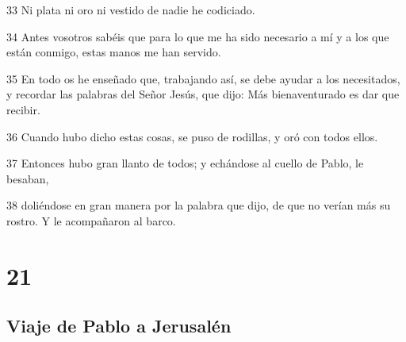 \par 33 Ni plata ni oro ni vestido de nadie he codiciado.
\par 34 Antes vosotros sabéis que para lo que me ha sido necesario a mí y a los que están conmigo, estas manos me han servido.
\par 35 En todo os he enseñado que, trabajando así, se debe ayudar a los necesitados, y recordar las palabras del Señor Jesús, que dijo: Más bienaventurado es dar que recibir.
\par 36 Cuando hubo dicho estas cosas, se puso de rodillas, y oró con todos ellos.
\par 37 Entonces hubo gran llanto de todos; y echándose al cuello de Pablo, le besaban,
\par 38 doliéndose en gran manera por la palabra que dijo, de que no verían más su rostro. Y le acompañaron al barco.

\chapter{21}

\section*{Viaje de Pablo a Jerusalén}

